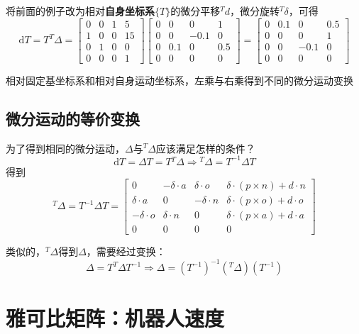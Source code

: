 \begin{note}
将前面的例子改为相对\textbf{自身坐标系}$\{T\}$的微分平移${}^Td$，微分旋转${}^T\delta$，可得
$$
\mathrm{d}T = T^{T} \Delta = 
\begin{bmatrix}
0 & 0 & 1 & 5 \\
1 & 0 & 0 & 15 \\
0 & 1 & 0 & 0 \\
0 & 0 & 0 & 1
\end{bmatrix}
\begin{bmatrix}
0 & 0 & 0 & 1 \\
0 & 0 & -0.1 & 0 \\
0 & 0.1 & 0 & 0.5 \\
0 & 0 & 0 & 0
\end{bmatrix}
=
\begin{bmatrix}
0 & 0.1 & 0 & 0.5 \\
0 & 0 & 0 & 1 \\
0 & 0 & -0.1 & 0 \\
0 & 0 & 0 & 0
\end{bmatrix}
$$

    相对固定基坐标系和相对自身运动坐标系，左乘与右乘得到不同的微分运动变换
\end{note}

\subsection{微分运动的等价变换}

\textcolor{whusakura}{为了得到相同的微分运动，$\Delta$与${}^T\Delta$应该满足怎样的条件？}
$$
\mathrm{d}T=\Delta T=T{}^T\Delta \Rightarrow \boxed{{}^T\Delta=T^{-1}\Delta T}
$$
得到
$$
{}^{T}\Delta = T^{-1}\Delta T = 
\begin{bmatrix}
0 & -\delta \cdot a & \delta \cdot o & \delta \cdot (p \times n) + d \cdot n \\
\delta \cdot a & 0 & -\delta \cdot n & \delta \cdot (p \times o) + d \cdot o \\
-\delta \cdot o & \delta \cdot n & 0 & \delta \cdot (p \times a) + d \cdot a \\
0 & 0 & 0 & 0
\end{bmatrix}
$$

类似的，${}^T\Delta$得到$\Delta$，需要经过变换：
$$
\Delta=T^T\Delta T^{-1} \Rightarrow \boxed{\Delta=(T^{-1})^{-1}({}^{T}\Delta) (T^{-1})}
$$

\section{雅可比矩阵：机器人速度}

